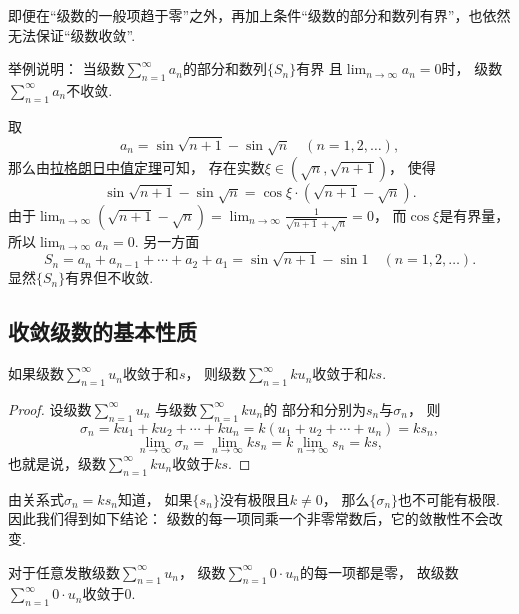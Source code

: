 即便在“级数的一般项趋于零”之外，再加上条件“级数的部分和数列有界”，也依然无法保证“级数收敛”.
\begin{example}
举例说明：
当级数\(\sum_{n=1}^\infty a_n\)的部分和数列\(\{S_n\}\)有界
且\(\lim_{n\to\infty} a_n = 0\)时，
级数\(\sum_{n=1}^\infty a_n\)不收敛.
\begin{solution}
取\[
	a_n = \sin\sqrt{n+1} - \sin\sqrt{n}
	\quad(n=1,2,\dotsc),
\]
那么由\hyperref[theorem:微分中值定理.拉格朗日中值定理]{拉格朗日中值定理}可知，
存在实数\(\xi\in(\sqrt{n},\sqrt{n+1})\)，
使得\[
	\sin\sqrt{n+1} - \sin\sqrt{n}
	= \cos\xi \cdot (\sqrt{n+1} - \sqrt{n}).
\]
由于\(\lim_{n\to\infty} (\sqrt{n+1} - \sqrt{n})
= \lim_{n\to\infty} \frac1{\sqrt{n+1} + \sqrt{n}}
= 0\)，
而\(\cos\xi\)是有界量，
所以\(\lim_{n\to\infty} a_n = 0\).
另一方面\[
	S_n = a_n + a_{n-1} + \dotsb + a_2 + a_1
	= \sin\sqrt{n+1} - \sin1
	\quad(n=1,2,\dotsc).
\]
显然\(\{S_n\}\)有界但不收敛.
\end{solution}
\end{example}

\subsection{收敛级数的基本性质}
\begin{property}\label{theorem:无穷级数.收敛级数性质1}
如果级数\(\sum_{n=1}^\infty u_n\)收敛于和\(s\)，
则级数\(\sum_{n=1}^\infty k u_n\)收敛于和\(ks\).
\begin{proof}
设级数\(\sum_{n=1}^\infty u_n\)
与级数\(\sum_{n=1}^\infty k u_n\)的
部分和分别为\(s_n\)与\(\sigma_n\)，
则\[
	\sigma_n
	= k u_1 + k u_2 + \dotsb + k u_n
	= k(u_1 + u_2 + \dotsb + u_n) = k s_n,
\]\[
	\lim_{n\to\infty} \sigma_n
	= \lim_{n\to\infty} k s_n
	= k \lim_{n\to\infty} s_n = ks,
\]
也就是说，级数\(\sum_{n=1}^\infty k u_n\)收敛于\(ks\).
\end{proof}
\end{property}
\begin{remark}
由关系式\(\sigma_n = k s_n\)知道，
如果\(\{s_n\}\)没有极限且\(k\neq0\)，
那么\(\{\sigma_n\}\)也不可能有极限.
因此我们得到如下结论：
{\color{red}级数的每一项同乘一个非零常数后，它的敛散性不会改变.}
\end{remark}
\begin{remark}
对于任意发散级数\(\sum_{n=1}^\infty u_n\)，
级数\(\sum_{n=1}^\infty 0 \cdot u_n\)的每一项都是零，
故级数\(\sum_{n=1}^\infty 0 \cdot u_n\)收敛于\(0\).
\end{remark}

